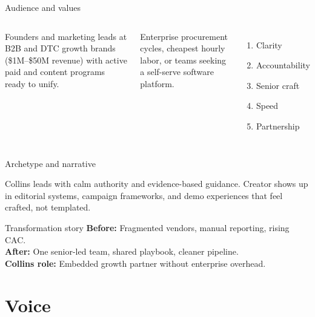 \documentclass[aspectratio=169,10pt]{beamer}
\begin{document}
\begin{frame}{Audience and values}
  \begin{columns}[T,onlytextwidth]
    \vspace{0.4em}

    Founders and marketing leads at B2B and DTC growth brands (\$1M--\$50M revenue) with active paid and content programs ready to unify.

    \vspace{0.8em}
    \vspace{0.4em}

    {\color{collinsSecondary}Enterprise procurement cycles, cheapest hourly labor, or teams seeking a self-serve software platform.}

    \vspace{0.4em}
    \begin{enumerate}
      \item Clarity
      \item Accountability
      \item Senior craft
      \item Speed
      \item Partnership
    \end{enumerate}
  \end{columns}
\end{frame}

\begin{frame}{Archetype and narrative}

  Collins leads with calm authority and evidence-based guidance. Creator shows up in editorial systems, campaign frameworks, and demo experiences that feel crafted, not templated.

  \vspace{0.8em}
  \begin{collinsblock}{Transformation story}
    \textbf{Before:} Fragmented vendors, manual reporting, rising CAC.\\
    \textbf{After:} One senior-led team, shared playbook, cleaner pipeline.\\
    \textbf{Collins role:} Embedded growth partner without enterprise overhead.
  \end{collinsblock}
\end{frame}

\section{Voice}
\end{document}
